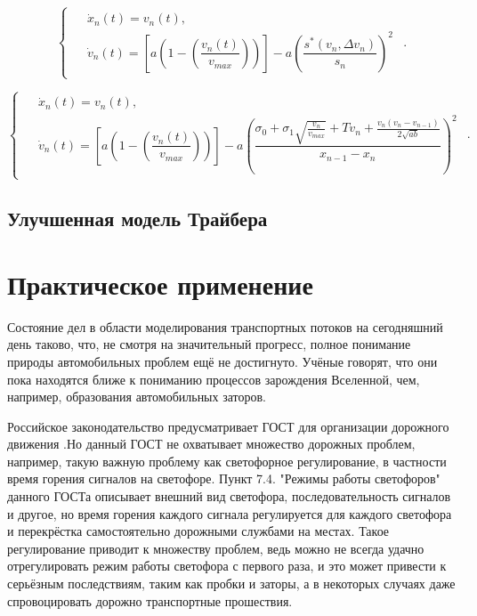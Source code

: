 \documentclass[12pt, a4paper]{extarticle}
\numberwithin{equation}{section}
\begin{document}
\begin{equation*}
\begin{cases}
\begin{split}
&\dot{x}_n(t) = v_n(t), \\
&\dot{v}_n(t)=\left[ a\left( 1-\left( \dfrac{v_n(t)}{v_{max}}\right) \right)\right] - a\left( \dfrac{s^*(v_n,\Delta v_n)}{s_n}\right)^2
\end{split}
\end{cases}.
\end{equation*}


\begin{equation*}
\begin{cases}
\begin{split}
&\dot{x}_n(t) = v_n(t), \\
&\dot{v}_n(t)=\left[ a\left( 1-\left( \dfrac{v_n(t)}{v_{max}}\right) \right)\right]-a\left( \dfrac{\sigma_0+\sigma_1\sqrt{\frac{v_n}{v_{max}}}+Tv_n+\frac{v_n(v_n-v_{n-1})}{2\sqrt{ab}}}{x_{n-1}-x_n}\right)^2
\end{split}
\end{cases}.
\end{equation*}


\subsection{Улучшенная модель Трайбера}

\section{Практическое применение} 

Состояние дел в области моделирования транспортных потоков на сегодняшний день таково, что, не смотря на значительный прогресс, полное понимание природы автомобильных проблем ещё не достигнуто. Учёные
говорят, что они пока находятся ближе к пониманию процессов зарождения Вселенной, чем, например, образования автомобильных заторов. 

Российское законодательство предусматривает ГОСТ для организации дорожного движения \cite{Gost}.Но данный ГОСТ не охватывает множество дорожных проблем, например, такую важную проблему как светофорное регулирование, в частности время горения сигналов на светофоре. Пункт 7.4. "Режимы работы светофоров"  данного ГОСТа описывает внешний вид светофора, последовательность сигналов и другое, но время горения каждого сигнала регулируется для каждого светофора и перекрёстка самостоятельно дорожными службами на местах. Такое регулирование приводит к множеству проблем, ведь можно не всегда удачно отрегулировать режим работы светофора с первого раза, и это может привести к серьёзным последствиям, таким как пробки и заторы, а в некоторых случаях даже спровоцировать дорожно транспортные прошествия.
\end{document}
